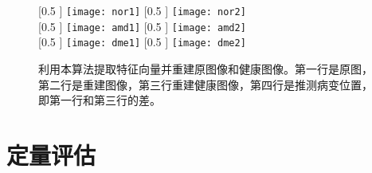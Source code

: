    \begin{figure}[h]
      \centering%
      [0.5 \textwidth] %
        {\texttt{[image: nor1]}} %
      \hspace{-4em}%
      [0.5 \textwidth] %
        {\texttt{[image: nor2]}} \\
      \vspace{1em}
      [0.5 \textwidth] %
        {\texttt{[image: amd1]}} %
      \hspace{-4em}%
      [0.5 \textwidth] %
        {\texttt{[image: amd2]}} \\
      \vspace{1em}
      [0.5 \textwidth] %
        {\texttt{[image: dme1]}} %
      \hspace{-4em}%
      [0.5 \textwidth] %
        {\texttt{[image: dme2]}} \\
      \caption[算法完整流程结果]{利用本算法提取特征向量并重建原图像和健康图像。第一行是原图，第二行是重建图像，第三行重建健康图像，第四行是推测病变位置，即第一行和第三行的差。}
      \label{fig:recon-all}
    \end{figure}




\section{定量评估}
    \label{sec:analyze}
